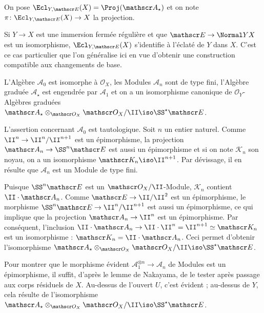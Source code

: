\documentclass[10pt]{../fichiers-configuration-latex/smfart}
\begin{document}
\begin{definition3}
On pose $\Ecl_{Y,\mathscr E}(X)=\Proj({\mathscr A}_\star)$ et on note
$\pi\colon \Ecl_{Y,\mathscr E}(X)\to X$ la projection.
\end{definition3}

\begin{remarque3}
Si $Y\to X$ est une immersion fermée
régulière et que $\mathscr E\to \Normal Y X$
est un isomorphisme, $\Ecl_{Y,\mathscr E}(X)$ s'identifie à l'éclaté de $Y$
dans $X$. C'est ce cas particulier que l'on généralise ici en vue d'obtenir
une construction compatible aux changements de base.
\end{remarque3}

\begin{proposition3}\label{16-proposition-proprietes-eclatement-modifie}
L'Algèbre ${\mathscr A}_0$ est isomorphe à ${\mathscr O}_X$, les Modules
${\mathscr A}_n$ sont de type fini, l'Algèbre graduée
${\mathscr A}_\star$ est engendrée par ${\mathscr A}_1$ et on a un 
isomorphisme canonique de $\mathscr O_Y$-Algèbres graduées 
$\mathscr A_\star \otimes_{\mathscr O_X}{\mathscr O_X/\II}\iso
\SS^\star \mathscr E$.
\end{proposition3}


L'assertion concernant $\mathscr A_0$ est tautologique.
Soit $n$ un entier naturel. Comme $\II^n \to \II^n/\II^{n+1}$ est un
épimorphisme, la projection $\mathscr A_n\to \SS^n\mathscr E$ est aussi un
épimorphisme et si on note $\mathscr K_n$ son noyau, on a un isomorphisme
$\mathscr K_n\iso \II^{n+1}$. Par dévissage, il en résulte que $\mathscr
A_n$ est un Module de type fini.

Puisque $\SS^n\mathscr E$ est un $\mathscr O_X/\II$-Module, $\mathscr K_n$
contient $\II\cdot\mathscr A_n$. Comme $\mathscr E\to \II/\II^2$ est un
épimorphisme, le morphisme $\SS^n\mathscr E\to \II^n/\II^{n+1}$ est aussi
un épimorphisme, ce qui implique que la projection $\mathscr A_n\to \II^n$
est un épimorphisme. Par conséquent, l'inclusion
$\II\cdot\mathscr A_n\to\II\cdot
\II^n=\II^{n+1}\simeq \mathscr K_n$ est un isomorphisme : $\mathscr
K_n=\II\cdot \mathscr A_n$. Ceci permet d'obtenir l'isomorphisme
$\mathscr A_\star\otimes_{\mathscr O_X} {\mathscr O_X/\II}\iso
\SS^\star \mathscr E$.

Pour montrer que le morphisme évident $\mathscr A_1^{\otimes n}\to
\mathscr A_n$ de Modules
est un épimorphisme, il suffit, d'après le lemme de
Nakayama, de le tester après passage aux corps résiduels de $X$.
Au-dessus de l'ouvert $U$, c'est évident ; au-dessus de $Y$, cela résulte
de l'isomorphisme 
$\mathscr A_\star\otimes_{\mathscr O_X} {\mathscr O_X/\II}\iso 
\SS^\star \mathscr E$.
\end{document}
